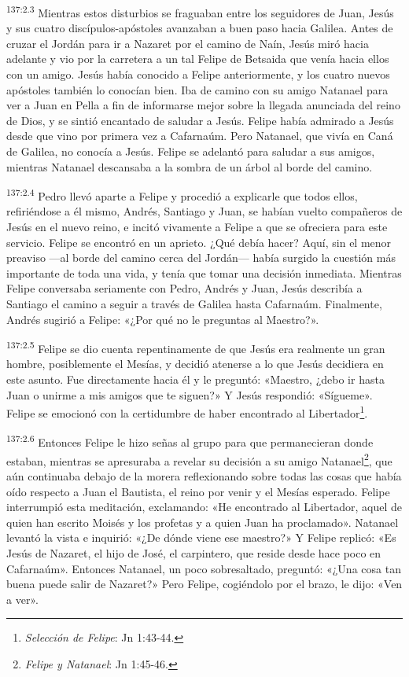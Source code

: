 \par
\textsuperscript{137:2.3} Mientras estos disturbios se fraguaban entre los seguidores de Juan, Jesús y sus cuatro discípulos-apóstoles avanzaban a buen paso hacia Galilea. Antes de cruzar el Jordán para ir a Nazaret por el camino de Naín, Jesús miró hacia adelante y vio por la carretera a un tal Felipe de Betsaida que venía hacia ellos con un amigo. Jesús había conocido a Felipe anteriormente, y los cuatro nuevos apóstoles también lo conocían bien. Iba de camino con su amigo Natanael para ver a Juan en Pella a fin de informarse mejor sobre la llegada anunciada del reino de Dios, y se sintió encantado de saludar a Jesús. Felipe había admirado a Jesús desde que vino por primera vez a Cafarnaúm. Pero Natanael, que vivía en Caná de Galilea, no conocía a Jesús. Felipe se adelantó para saludar a sus amigos, mientras Natanael descansaba a la sombra de un árbol al borde del camino.

\par
\textsuperscript{137:2.4} Pedro llevó aparte a Felipe y procedió a explicarle que todos ellos, refiriéndose a él mismo, Andrés, Santiago y Juan, se habían vuelto compañeros de Jesús en el nuevo reino, e incitó vivamente a Felipe a que se ofreciera para este servicio. Felipe se encontró en un aprieto. ¿Qué debía hacer? Aquí, sin el menor preaviso ---al borde del camino cerca del Jordán--- había surgido la cuestión más importante de toda una vida, y tenía que tomar una decisión inmediata. Mientras Felipe conversaba seriamente con Pedro, Andrés y Juan, Jesús describía a Santiago el camino a seguir a través de Galilea hasta Cafarnaúm. Finalmente, Andrés sugirió a Felipe: «¿Por qué no le preguntas al Maestro?».

\par
\textsuperscript{137:2.5} Felipe se dio cuenta repentinamente de que Jesús era realmente un gran hombre, posiblemente el Mesías, y decidió atenerse a lo que Jesús decidiera en este asunto. Fue directamente hacia él y le preguntó: «Maestro, ¿debo ir hasta Juan o unirme a mis amigos que te siguen?» Y Jesús respondió: «Sígueme». Felipe se emocionó con la certidumbre de haber encontrado al Libertador\footnote{\textit{Selección de Felipe}: Jn 1:43-44.}.

\par
\textsuperscript{137:2.6} Entonces Felipe le hizo señas al grupo para que permanecieran donde estaban, mientras se apresuraba a revelar su decisión a su amigo Natanael\footnote{\textit{Felipe y Natanael}: Jn 1:45-46.}, que aún continuaba debajo de la morera reflexionando sobre todas las cosas que había oído respecto a Juan el Bautista, el reino por venir y el Mesías esperado. Felipe interrumpió esta meditación, exclamando: «He encontrado al Libertador, aquel de quien han escrito Moisés y los profetas y a quien Juan ha proclamado». Natanael levantó la vista e inquirió: «¿De dónde viene ese maestro?» Y Felipe replicó: «Es Jesús de Nazaret, el hijo de José, el carpintero, que reside desde hace poco en Cafarnaúm». Entonces Natanael, un poco sobresaltado, preguntó: «¿Una cosa tan buena puede salir de Nazaret?» Pero Felipe, cogiéndolo por el brazo, le dijo: «Ven a ver».

